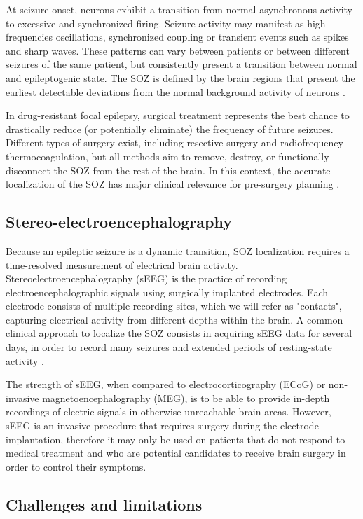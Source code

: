 At seizure onset, neurons exhibit a transition from normal asynchronous activity
to excessive and synchronized firing.
Seizure activity may manifest as high frequencies oscillations, synchronized
coupling or transient events such as spikes and sharp waves.
These patterns can vary between patients or between different seizures of the 
same patient, but consistently present a transition between normal and 
epileptogenic state.
The SOZ is defined by the brain regions that present the earliest detectable
deviations from the normal background activity of neurons \cite{ep-seiz}.

In drug-resistant focal epilepsy, surgical treatment represents the best chance 
to drastically reduce (or potentially eliminate) the frequency of future
seizures.
Different types of surgery exist, including resective surgery and
radiofrequency thermocoagulation, but all methods aim to remove, destroy, or
functionally disconnect the SOZ from the rest of the brain.
In this context, the accurate localization of the SOZ has major clinical
relevance for pre-surgery planning \cite{ep-sozsurg}.

\subsection{Stereo-electroencephalography}

Because an epileptic seizure is a dynamic transition, SOZ localization requires
a time-resolved measurement of electrical brain activity.
Stereoelectroencephalography (sEEG) is the practice of recording
electroencephalographic signals using surgically implanted electrodes.
Each electrode consists of multiple recording sites, which we will
refer as "contacts", capturing electrical activity from different depths within
the brain.
A common clinical approach to localize the SOZ consists in acquiring sEEG data
for several days, in order to record many seizures and extended periods of
resting-state activity \cite{ep-seeg}.

The strength of sEEG, when compared to electrocorticography (ECoG)
or non-invasive magnetoencephalography (MEG),
is to be able to provide in-depth recordings of electric signals in otherwise
unreachable brain areas. 
However, sEEG is an invasive procedure that requires surgery during the
electrode implantation, therefore it may only be used on patients that do not
respond to medical treatment and who are potential candidates to receive brain
surgery in order to control their symptoms.

\subsection{Challenges and limitations}

